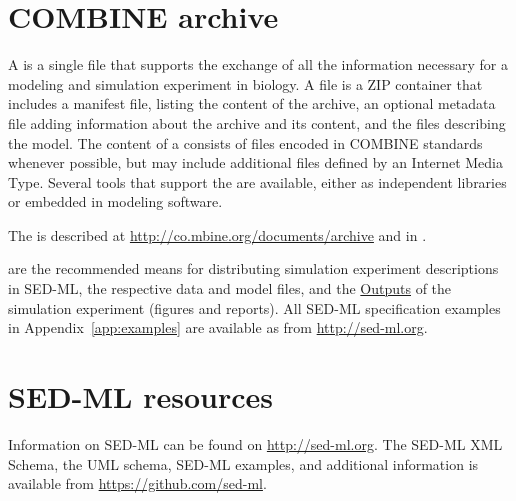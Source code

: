 \section{COMBINE archive}
\label{sec:archive}

A  \citep{Bergmann2014} is a single file that supports the exchange of all the information necessary for a modeling and simulation experiment in biology. A  file is a ZIP container that includes a manifest file, listing the content of the archive, an optional metadata file adding information about the archive and its content, and the files describing the model. The content of a  consists of files encoded in COMBINE standards whenever possible, but may include additional files defined by an Internet Media Type. Several tools that support the  are available, either as independent libraries or embedded in modeling software.

The  is described at \url{http://co.mbine.org/documents/archive} and 
in \citep{Bergmann2014}.

 are the recommended means for distributing simulation experiment descriptions in SED-ML, the respective data and model files, and the \hyperref[class:output]{Outputs} of the simulation experiment (figures and reports). All SED-ML specification examples in Appendix~\ref{app:examples} are available as  from \url{http://sed-ml.org}.

\section{SED-ML resources}
\label{sec:resources}

Information on SED-ML can be found on \url{http://sed-ml.org}. The SED-ML XML Schema, the UML schema, SED-ML examples, and additional information is available from \url{https://github.com/sed-ml}.
